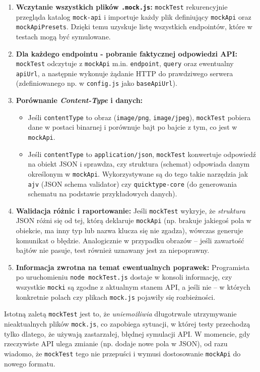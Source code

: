 \documentclass[12pt]{report}
\begin{document}
\begin{enumerate}
    \item \textbf{Wczytanie wszystkich plików \texttt{.mock.js}:} \texttt{mockTest} rekurencyjnie przegląda katalog \texttt{mock-api} i importuje każdy plik definiujący \texttt{mockApi} oraz \texttt{mockApiPresets}. Dzięki temu uzyskuje listę wszystkich endpointów, które w testach mogą być symulowane.
    \item \textbf{Dla każdego endpointu - pobranie faktycznej odpowiedzi API:} \texttt{mockTest} odczytuje z \texttt{mockApi} m.in. \texttt{endpoint}, \texttt{query} oraz ewentualny \texttt{apiUrl}, a następnie wykonuje żądanie HTTP do prawdziwego serwera (zdefiniowanego np. w \texttt{config.js} jako \texttt{baseApiUrl}).  
    \item \textbf{Porównanie \emph{Content-Type} i danych:}  
    \begin{itemize}
        \item Jeśli \texttt{contentType} to obraz (\texttt{image/png}, \texttt{image/jpeg}), \texttt{mockTest} pobiera dane w postaci binarnej i porównuje bajt po bajcie z tym, co jest w \texttt{mockApi}.  
        \item Jeśli \texttt{contentType} to \texttt{application/json}, \texttt{mockTest} konwertuje odpowiedź na obiekt JSON i sprawdza, czy struktura (schemat) odpowiada danym określonym w \texttt{mockApi}. Wykorzystywane są do tego takie narzędzia jak \texttt{ajv} (JSON schema validator) czy \texttt{quicktype-core} (do generowania schematu na podstawie przykładowych danych).
    \end{itemize}
    \item \textbf{Walidacja różnic i raportowanie:} Jeśli \texttt{mockTest} wykryje, że \emph{struktura} JSON różni się od tej, którą deklaruje \texttt{mockApi} (np. brakuje jakiegoś pola w obiekcie, ma inny typ lub nazwa klucza się nie zgadza), wówczas generuje komunikat o błędzie. Analogicznie w przypadku obrazów – jeśli zawartość bajtów nie pasuje, test również uznawany jest za niepoprawny.
    \item \textbf{Informacja zwrotna na temat ewentualnych poprawek:} Programista po uruchomieniu \texttt{node mockTest.js} dostaje w konsoli informację, czy wszystkie \texttt{mocki} są zgodne z aktualnym stanem API, a jeśli nie – w których konkretnie polach czy plikach \texttt{mock.js} pojawiły się rozbieżności.
\end{enumerate}

\noindent Istotną zaletą \texttt{mockTest} jest to, że \emph{uniemożliwia} długotrwałe utrzymywanie nieaktualnych plików \texttt{mock.js}, co zapobiega sytuacji, w której testy przechodzą tylko dlatego, że używają zastarzałej, błędnej symulacji API. W momencie, gdy rzeczywiste API ulega zmianie (np. dodaje nowe pola w JSON), od razu wiadomo, że \texttt{mockTest} tego nie przepuści i wymusi dostosowanie \texttt{mockApi} do nowego formatu.
\end{document}
